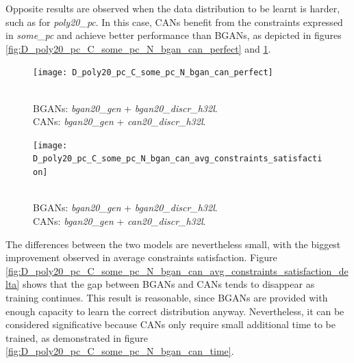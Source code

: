 Opposite results are observed when the data distribution to be learnt is harder, such as for \textit{poly20\_pc}. In this case, CANs benefit from the constraints expressed in \textit{some\_pc} and achieve better performance than BGANs, as depicted in figures \ref{fig:D_poly20_pc_C_some_pc_N_bgan_can_perfect} and \ref{fig:D_poly20_pc_C_some_pc_N_bgan_can_avg_constraints_satisfaction}.

\begin{figure}[ht]
    \centering
    \begin{minipage}[t]{0.45\textwidth}
        \centering
        \texttt{[image: D\_poly20\_pc\_C\_some\_pc\_N\_bgan\_can\_perfect]}
        \caption{\\BGANs: \textit{bgan20\_gen} + \textit{bgan20\_discr\_h32l}.\\
        CANs: \textit{bgan20\_gen} + \textit{can20\_discr\_h32l}.}
        \label{fig:D_poly20_pc_C_some_pc_N_bgan_can_perfect}
    \end{minipage}
    \hfill
    \begin{minipage}[t]{0.45\textwidth}
        \centering
        \texttt{[image: D\_poly20\_pc\_C\_some\_pc\_N\_bgan\_can\_avg\_constraints\_satisfaction]}
        \caption{\\BGANs: \textit{bgan20\_gen} + \textit{bgan20\_discr\_h32l}.\\
        CANs: \textit{bgan20\_gen} + \textit{can20\_discr\_h32l}.}
        \label{fig:D_poly20_pc_C_some_pc_N_bgan_can_avg_constraints_satisfaction}
    \end{minipage}
\end{figure}

The differences between the two models are nevertheless small, with the biggest improvement observed in average constraints satisfaction. Figure \ref{fig:D_poly20_pc_C_some_pc_N_bgan_can_avg_constraints_satisfaction_delta} shows that the gap between BGANs and CANs tends to disappear as training continues. This result is reasonable, since BGANs are provided with enough capacity to learn the correct distribution anyway. Nevertheless, it can be considered significative because CANs only require small additional time to be trained, as demonstrated in figure \ref{fig:D_poly20_pc_C_some_pc_N_bgan_can_time}.

